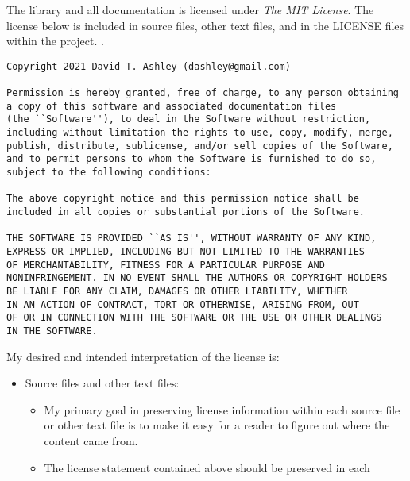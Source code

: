 The library and all documentation is licensed under \emph{The MIT License}.
The license below is included in source files, other text files, and in the
LICENSE files within the project.
\emph{\productbasenameshort{}}.

\begin{small}
\begin{verbatim}
Copyright 2021 David T. Ashley (dashley@gmail.com)

Permission is hereby granted, free of charge, to any person obtaining
a copy of this software and associated documentation files
(the ``Software''), to deal in the Software without restriction,
including without limitation the rights to use, copy, modify, merge,
publish, distribute, sublicense, and/or sell copies of the Software,
and to permit persons to whom the Software is furnished to do so,
subject to the following conditions:

The above copyright notice and this permission notice shall be
included in all copies or substantial portions of the Software.

THE SOFTWARE IS PROVIDED ``AS IS'', WITHOUT WARRANTY OF ANY KIND,
EXPRESS OR IMPLIED, INCLUDING BUT NOT LIMITED TO THE WARRANTIES
OF MERCHANTABILITY, FITNESS FOR A PARTICULAR PURPOSE AND
NONINFRINGEMENT. IN NO EVENT SHALL THE AUTHORS OR COPYRIGHT HOLDERS
BE LIABLE FOR ANY CLAIM, DAMAGES OR OTHER LIABILITY, WHETHER
IN AN ACTION OF CONTRACT, TORT OR OTHERWISE, ARISING FROM, OUT
OF OR IN CONNECTION WITH THE SOFTWARE OR THE USE OR OTHER DEALINGS
IN THE SOFTWARE.
\end{verbatim}
\end{small}

My desired and intended interpretation of the license is:

\begin{itemize}
\item Source files and other text files:
      \begin{itemize}
      \item My primary goal in preserving license information within
            each source file or other text file is to make it easy
            for a reader to figure out where the content came from.
      \item The license statement contained above should be preserved
            in each 
      \end{itemize}
\end{itemize}
